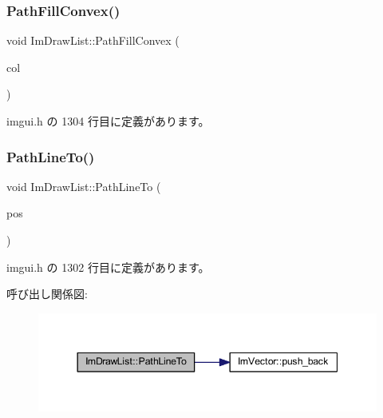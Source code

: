 \subsubsection{\texorpdfstring{Path\+Fill\+Convex()}{PathFillConvex()}}
{\footnotesize\ttfamily void Im\+Draw\+List\+::\+Path\+Fill\+Convex (\begin{DoxyParamCaption}\item[{\mbox{\hyperlink{imgui_8h_a118cff4eeb8d00e7d07ce3d6460eed36}{Im\+U32}}}]{col }\end{DoxyParamCaption})\hspace{0.3cm}{\ttfamily [inline]}}



 imgui.\+h の 1304 行目に定義があります。

\mbox{\label{struct_im_draw_list_a828d944325ed58d8b57abd3647bffaaf}} 
\subsubsection{\texorpdfstring{Path\+Line\+To()}{PathLineTo()}}
{\footnotesize\ttfamily void Im\+Draw\+List\+::\+Path\+Line\+To (\begin{DoxyParamCaption}\item[{const \mbox{\hyperlink{struct_im_vec2}{Im\+Vec2}} \&}]{pos }\end{DoxyParamCaption})\hspace{0.3cm}{\ttfamily [inline]}}



 imgui.\+h の 1302 行目に定義があります。

呼び出し関係図\+:\nopagebreak
\begin{figure}[H]
\begin{center}
\leavevmode
\includegraphics[width=344pt]{struct_im_draw_list_a828d944325ed58d8b57abd3647bffaaf_cgraph}
\end{center}
\end{figure}
\mbox{\label{struct_im_draw_list_aa3dd11945fb62495f8b9e1392ed724e3}} 
